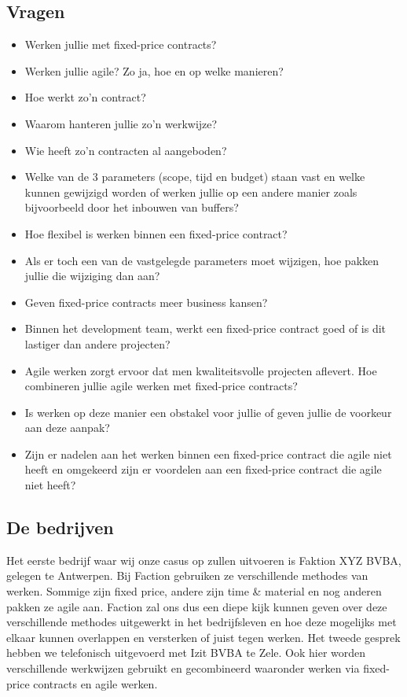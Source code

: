 \documentclass{hogent-article}
\begin{document}
	\subsection{Vragen}
	\begin{itemize}
		\item Werken jullie met fixed-price contracts?
		\item Werken jullie agile? Zo ja, hoe en op welke manieren?
		\item Hoe werkt zo'n contract?
		\item Waarom hanteren jullie zo’n werkwijze?
		\item Wie heeft zo'n contracten al aangeboden?
		\item Welke van de 3 parameters (scope, tijd en budget) staan vast en welke kunnen gewijzigd worden of werken jullie op een andere manier zoals bijvoorbeeld door het inbouwen van buffers?
		\item Hoe flexibel is werken binnen een fixed-price contract?
		\item Als er toch een van de vastgelegde parameters moet wijzigen, hoe pakken jullie die wijziging dan aan?
		\item Geven fixed-price contracts meer business kansen?
		\item Binnen het development team, werkt een fixed-price contract goed of is dit lastiger dan andere projecten?
		\item Agile werken zorgt ervoor dat men kwaliteitsvolle projecten aflevert. Hoe combineren jullie agile werken met fixed-price contracts?
		\item Is werken op deze manier een obstakel voor jullie of geven jullie de voorkeur aan deze aanpak?
		\item Zijn er nadelen aan het werken binnen een fixed-price contract die agile niet heeft en omgekeerd zijn er voordelen aan een fixed-price contract die agile niet heeft?
	\end{itemize}
		
    \subsection{De bedrijven}
    Het eerste bedrijf waar wij onze casus op zullen uitvoeren is Faktion XYZ BVBA, gelegen te Antwerpen. Bij Faction gebruiken ze verschillende methodes van werken. Sommige zijn fixed price, andere zijn time \& material en nog anderen pakken ze agile aan. Faction zal ons dus een diepe kijk kunnen geven over deze verschillende methodes uitgewerkt in het bedrijfsleven en hoe deze mogelijks met elkaar kunnen overlappen en versterken of juist tegen werken.
    \linebreak
    \linebreak
    Het tweede gesprek hebben we telefonisch uitgevoerd met Izit BVBA te Zele. Ook hier worden verschillende werkwijzen gebruikt en gecombineerd waaronder werken via fixed-price contracts en agile werken.
    
\end{document}
